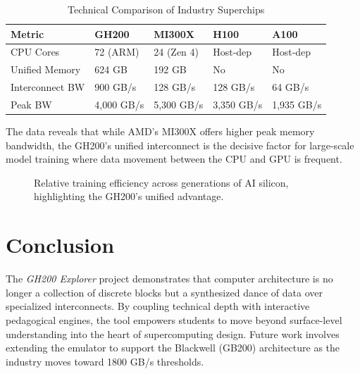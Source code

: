 \documentclass[12pt, a4paper]{article}
\begin{document}
\begin{table}[ht]
  \centering
  \caption{Technical Comparison of Industry Superchips}
  \label{tab:bench}
  \begin{tabularx}{\textwidth}{@{}lYYYY@{}}
    \toprule
    \textbf{Metric} & \textbf{GH200} & \textbf{MI300X} & \textbf{H100} & \textbf{A100} \\
    \midrule
    CPU Cores       & 72 (ARM)       & 24 (Zen 4)      & Host-dep      & Host-dep \\
    Unified Memory  & 624 GB         & 192 GB          & No            & No \\
    Interconnect BW & 900 GB/s       & 128 GB/s        & 128 GB/s      & 64 GB/s \\
    Peak BW         & 4,000 GB/s     & 5,300 GB/s      & 3,350 GB/s    & 1,935 GB/s \\
    \bottomrule
  \end{tabularx}
\end{table}

The data reveals that while AMD's MI300X offers higher peak memory bandwidth, the GH200's unified interconnect is the decisive factor for large-scale model training where data movement between the CPU and GPU is frequent.

\begin{figure}[H]
\centering
{}
\caption{Relative training efficiency across generations of AI silicon, highlighting the GH200's unified advantage.}
\end{figure}

\section{Conclusion}
\label{sec:conclusion}

The \textit{GH200 Explorer} project demonstrates that computer architecture is no longer a collection of discrete blocks but a synthesized dance of data over specialized interconnects. By coupling technical depth with interactive pedagogical engines, the tool empowers students to move beyond surface-level understanding into the heart of supercomputing design. Future work involves extending the emulator to support the Blackwell (GB200) architecture as the industry moves toward 1800 GB/s thresholds.
\end{document}
